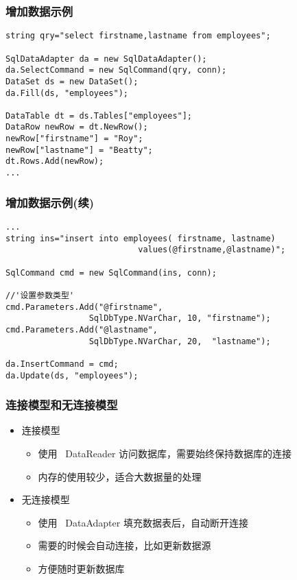 \begin{frame}[fragile]
\frametitle{增加数据示例} %
\begin{lstlisting}
string qry="select firstname,lastname from employees";

SqlDataAdapter da = new SqlDataAdapter();
da.SelectCommand = new SqlCommand(qry, conn);
DataSet ds = new DataSet();
da.Fill(ds, "employees");

DataTable dt = ds.Tables["employees"];
DataRow newRow = dt.NewRow();
newRow["firstname"] = "Roy";
newRow["lastname"] = "Beatty";
dt.Rows.Add(newRow);
...
\end{lstlisting}
\end{frame}

\begin{frame}[fragile]
\frametitle{增加数据示例(续)}
\begin{lstlisting}[escapeinside='']
...
string ins="insert into employees( firstname, lastname)
                           values(@firstname,@lastname)";

SqlCommand cmd = new SqlCommand(ins, conn);

//'设置参数类型'
cmd.Parameters.Add("@firstname",
                 SqlDbType.NVarChar, 10, "firstname");
cmd.Parameters.Add("@lastname",
                 SqlDbType.NVarChar, 20,  "lastname");

da.InsertCommand = cmd;
da.Update(ds, "employees");
\end{lstlisting}
\end{frame}

\begin{frame}
\frametitle{连接模型和无连接模型}
\begin{itemize}
  \setlength{\itemsep}{8pt plus 1pt}
\item 连接模型
  \begin{itemize}
    \setlength{\itemsep}{6pt plus 1pt}
  \item 使用 ~DataReader 访问数据库，需要始终保持数据库的连接
  \item 内存的使用较少，适合大数据量的处理
  \end{itemize}
\item 无连接模型
  \begin{itemize}
    \setlength{\itemsep}{6pt plus 1pt}
  \item 使用 ~DataAdapter 填充数据表后，自动断开连接
  \item 需要的时候会自动连接，比如更新数据源
  \item 方便随时更新数据库
  \end{itemize}
\end{itemize}
\end{frame}

